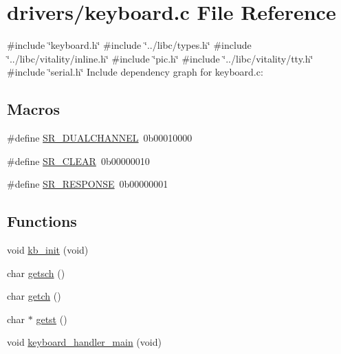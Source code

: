 \hypertarget{a00038}{}\section{drivers/keyboard.c File Reference}
\label{a00038}
{\ttfamily \#include \char`\"{}keyboard.\+h\char`\"{}}\newline
{\ttfamily \#include \char`\"{}../libc/types.\+h\char`\"{}}\newline
{\ttfamily \#include \char`\"{}../libc/vitality/inline.\+h\char`\"{}}\newline
{\ttfamily \#include \char`\"{}pic.\+h\char`\"{}}\newline
{\ttfamily \#include \char`\"{}../libc/vitality/tty.\+h\char`\"{}}\newline
{\ttfamily \#include \char`\"{}serial.\+h\char`\"{}}\newline
Include dependency graph for keyboard.\+c\+:
\subsection*{Macros}
\begin{DoxyCompactItemize}
\item 
\#define \hyperlink{a00038_addafe32b109f94a57ae4bf1a1dca05e0_addafe32b109f94a57ae4bf1a1dca05e0}{S\+R\+\_\+\+D\+U\+A\+L\+C\+H\+A\+N\+N\+EL}~0b00010000
\item 
\#define \hyperlink{a00038_a8aa66e8bc828742fb4819d7cd2df598d_a8aa66e8bc828742fb4819d7cd2df598d}{S\+R\+\_\+\+C\+L\+E\+AR}~0b00000010
\item 
\#define \hyperlink{a00038_ac9efa716f8185bae296975136b510c30_ac9efa716f8185bae296975136b510c30}{S\+R\+\_\+\+R\+E\+S\+P\+O\+N\+SE}~0b00000001
\end{DoxyCompactItemize}
\subsection*{Functions}
\begin{DoxyCompactItemize}
\item 
void \hyperlink{a00038_aabdb223e5290f3b3c07bc82d075b87d7_aabdb223e5290f3b3c07bc82d075b87d7}{kb\+\_\+init} (void)
\item 
char \hyperlink{a00038_aa7ee03b27a489828ce588d0fc023cab3_aa7ee03b27a489828ce588d0fc023cab3}{getsch} ()
\item 
char \hyperlink{a00038_af3facad10e05defa48d45b46eb9ebe7e_af3facad10e05defa48d45b46eb9ebe7e}{getch} ()
\item 
char $\ast$ \hyperlink{a00038_ab88a2e96bbe585e228a5b201435c0240_ab88a2e96bbe585e228a5b201435c0240}{getst} ()
\item 
void \hyperlink{a00038_a1db933be72a0547c4070ba55e6697ba2_a1db933be72a0547c4070ba55e6697ba2}{keyboard\+\_\+handler\+\_\+main} (void)
\end{DoxyCompactItemize}
